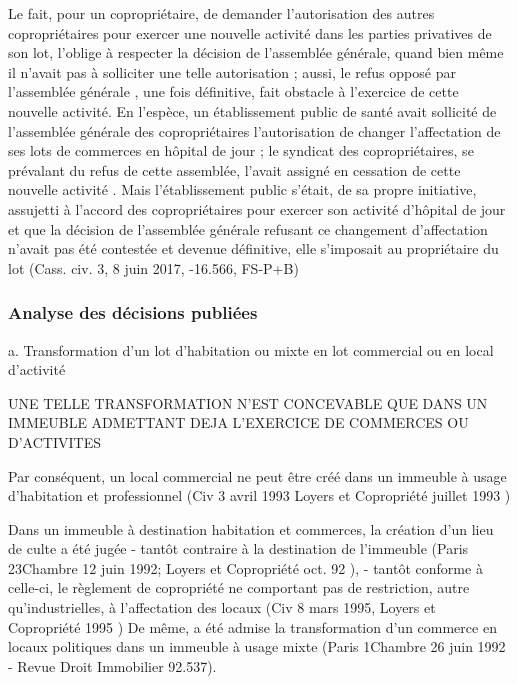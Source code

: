 				Le fait, pour un copropriétaire, de demander l'autorisation des autres copropriétaires pour exercer une nouvelle activité dans les parties privatives de son lot, l'oblige à respecter la décision de l'assemblée générale, quand bien même il n'avait pas à solliciter une telle autorisation ; aussi, le refus opposé par l'assemblée générale , une fois définitive, fait obstacle à l'exercice de cette nouvelle activité. En l'espèce, un établissement public de santé avait sollicité de l'assemblée générale des copropriétaires l'autorisation de changer l'affectation de ses lots de commerces en hôpital de jour ; le syndicat des copropriétaires, se prévalant du refus de cette assemblée, l'avait assigné en cessation de cette nouvelle activité . Mais l'établissement public s'était, de sa propre initiative, assujetti à l'accord des copropriétaires pour exercer son activité d'hôpital de jour et que la décision de l'assemblée générale refusant ce changement d'affectation n'avait pas été contestée et devenue définitive, elle s'imposait au propriétaire du lot
				(Cass. civ. 3, 8 juin 2017, -16.566, FS-P+B)
			
		\subsubsection{Analyse des décisions publiées}
			
			a. Transformation d'un lot d'habitation ou mixte en lot commercial ou en local d’activité
			
				UNE TELLE TRANSFORMATION N'EST CONCEVABLE QUE DANS UN IMMEUBLE ADMETTANT DEJA L’EXERCICE DE COMMERCES OU D’ACTIVITES
				
				Par conséquent, un local commercial ne peut être créé dans un immeuble à usage d'habitation et professionnel (Civ 3 avril 1993 Loyers et Copropriété juillet 1993 )
				
				Dans un immeuble à destination habitation et commerces, la création d’un lieu de culte a été jugée
				- tantôt contraire à la destination de l’immeuble (Paris 23\degres Chambre 12 juin 1992; Loyers et Copropriété oct. 92 ),
				- tantôt conforme à celle-ci, le règlement de copropriété ne comportant pas de restriction, autre qu’industrielles, à l’affectation des locaux (Civ 8 mars 1995, Loyers et Copropriété 1995 )
				De même, a été admise la transformation d’un commerce en locaux politiques dans un immeuble à usage mixte (Paris 1\degres Chambre 26 juin 1992 - Revue Droit Immobilier 92.537).
				
